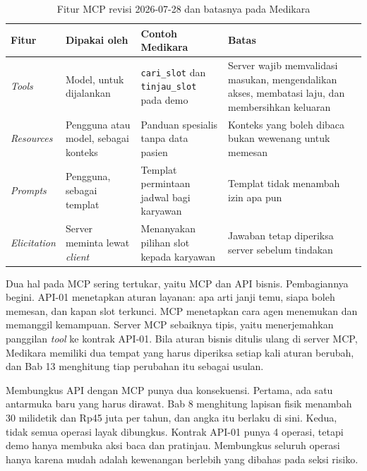 \begin{table}[!htb]
  \centering
  \caption{Fitur MCP revisi 2026-07-28 dan batasnya pada Medikara}
  \label{tab:ch14-fitur-mcp}
  \footnotesize
  \begin{tabularx}{\textwidth}{H{1.9cm}H{2.7cm}GG}
    \hline
    \textbf{Fitur} & \textbf{Dipakai oleh} & \textbf{Contoh Medikara} & \textbf{Batas} \\ \hline
    \textit{Tools} & Model, untuk dijalankan & \texttt{cari\_slot} dan \texttt{tinjau\_slot} pada demo & Server wajib memvalidasi masukan, mengendalikan akses, membatasi laju, dan membersihkan keluaran \\ \hline
    \textit{Resources} & Pengguna atau model, sebagai konteks & Panduan spesialis tanpa data pasien & Konteks yang boleh dibaca bukan wewenang untuk memesan \\ \hline
    \textit{Prompts} & Pengguna, sebagai templat & Templat permintaan jadwal bagi karyawan & Templat tidak menambah izin apa pun \\ \hline
    \textit{Elicitation} & Server meminta lewat \textit{client} & Menanyakan pilihan slot kepada karyawan & Jawaban tetap diperiksa server sebelum tindakan \\ \hline
  \end{tabularx}
\end{table}

Dua hal pada MCP sering tertukar, yaitu MCP dan API bisnis. Pembagiannya begini. API-01 menetapkan aturan layanan: apa arti janji temu, siapa boleh memesan, dan
kapan slot terkunci. MCP menetapkan cara agen menemukan dan memanggil kemampuan. Server MCP sebaiknya tipis, yaitu menerjemahkan panggilan \textit{tool} ke kontrak
API-01. Bila aturan bisnis ditulis ulang di server MCP, Medikara memiliki dua tempat yang harus diperiksa setiap kali aturan berubah, dan Bab 13 menghitung tiap
perubahan itu sebagai usulan.

Membungkus API dengan MCP punya dua konsekuensi. Pertama, ada satu antarmuka baru yang harus dirawat. Bab 8 menghitung lapisan fisik menambah 30 milidetik dan
Rp45 juta per tahun, dan angka itu berlaku di sini. Kedua, tidak semua operasi layak dibungkus. Kontrak API-01 punya 4 operasi, tetapi demo hanya membuka aksi baca
dan pratinjau. Membungkus seluruh operasi hanya karena mudah adalah kewenangan berlebih yang dibahas pada seksi risiko.

